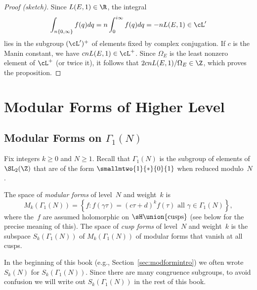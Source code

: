 \documentclass{report}
\begin{document}
\begin{proof}[Proof (sketch)]
Since $L(E,1)\in\R$, the integral
\[\int_{n\{0,\infty\}} f(q) dq = n\int_{0}^{i\infty} f(q) dq=-n L(E,1)\in\cL'\]
lies in the subgroup $(\cL')^+$ of elements fixed by complex
conjugation. If $c$ is the Manin constant, we have
$cnL(E,1)\in\cL^+$.  Since $\Omega_E$ is the least nonzero element
of $\cL^+$ (or twice it), it follows that
$2cnL(E,1)/\Omega_E\in\Z$, which proves the proposition.
\end{proof}
\chapter{Modular Forms of Higher Level}

\section{Modular Forms on $\Gamma_1(N)$}


Fix integers $k\geq 0$ and $N\geq 1$.  Recall that $\Gamma_1(N)$
is the subgroup of elements of $\SL_2(\Z)$ that are of the form
$\smallmtwo{1}{*}{0}{1}$ when reduced modulo~$N$.
\begin{definition}
The space of {\em modular forms} of level~$N$ and weight~$k$ is
\[
   M_k(\Gamma_1(N)) = \left\{ f : f(\gamma \tau) = (c\tau+d)^{k}f(\tau) \text{ all }
                            \gamma \in \Gamma_1(N) \right\},
\]
where the~$f$ are assumed holomorphic on $\sH\union\{\text{cusps}\}$ (see below for
the precise meaning of this).  The space of {\em cusp forms} of level~$N$ and weight~$k$
is the subspace $S_k(\Gamma_1(N))$ of $M_k(\Gamma_1(N))$ of modular forms that vanish
at all cusps.
\end{definition}

\begin{remark}
  In the beginning of this book (e.g., Section~\ref{sec:modformintro})
  we often wrote $S_k(N)$ for $S_k(\Gamma_1(N))$.  Since there are
  many congruence subgroups, to avoid confusion we will write out
  $S_k(\Gamma_1(N))$ in the rest of this book.
\end{remark}
\end{document}
